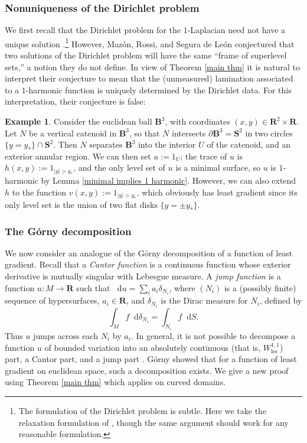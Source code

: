 \documentclass[reqno,11pt]{amsart}
\newcommand{\RR}{\mathbf{R}}
\newcommand{\Sph}{\mathbf S}
\newcommand{\Ball}{\mathbf{B}}
\newcommand*\dif{\mathop{}\!\mathrm{d}}
\newcommand{\dfn}[1]{\emph{#1}\index{#1}}
\newcommand{\loc}{\mathrm{loc}}
\theoremstyle{definition}
\newtheorem{example}[theorem]{Example}
\numberwithin{equation}{section}
\begin{document}
\subsubsection{Nonuniqueness of the Dirichlet problem}
We first recall that the Dirichlet problem for the $1$-Laplacian need not have a unique solution \cite[Example 2.7]{Mazon14}.\footnote{The formulation of the Dirichlet problem is subtle. Here we take the relaxation formulation of \cite[Definition 2.3]{Mazon14}, though the same argument should work for any reasonable formulation.}
However, Maz\'on, Rossi, and Segura de Le\'on \cite[Remark 2.8]{Mazon14} conjectured that two solutions of the Dirichlet problem will have the same ``frame of superlevel sets,'' a notion they do not define.
In view of Theorem \ref{main thm} it is natural to interpret their conjecture to mean that the (unmeasured) lamination associated to a $1$-harmonic function is uniquely determined by the Dirichlet data.
For this interpretation, their conjecture is false:

\begin{example}
Consider the euclidean ball $\Ball^3$, with coordinates $(x, y) \in \RR^2 \times \RR$.
Let $N$ be a vertical catenoid in $\Ball^3$, so that $N$ intersects $\partial \Ball^3 = \Sph^2$ in two circles $\{y = y_*\} \cap \Sph^2$.
Then $N$ separates $\Ball^3$ into the interior $U$ of the catenoid, and an exterior annular region.
We can then set $u := 1_U$; the trace of $u$ is $h(x, y) := 1_{|y| > y_*}$, and the only level set of $u$ is a minimal surface, so $u$ is $1$-harmonic by Lemma \ref{minimal implies 1 harmonic}.
However, we can also extend $h$ to the function $v(x, y) := 1_{|y| > y_*}$, which obviously has least gradient since its only level set is the union of two flat disks $\{y = \pm y_*\}$.
\end{example}

\subsubsection{The G\'orny decomposition}
We now consider an analogue of the G\'orny decomposition \cite[Theorem 1.2]{górny2017planar} of a function of least gradient.
Recall that a \dfn{Cantor function} is a continuous function whose exterior derivative is mutually singular with Lebesgue measure.
A \dfn{jump function} is a function $u: M \to \RR$ such that $\dif u = \sum_i a_i \delta_{N_i}$, where $(N_i)$ is a (possibly finite) sequence of hypersurfaces, $a_i \in \RR$, and $\delta_{N_i}$ is the Dirac measure for $N_i$, defined by
$$\int_M f \dif \delta_{N_i} = \int_{N_i} f \dif S.$$
Thus $u$ jumps across each $N_i$ by $a_i$.
In general, it is not possible to decompose a function $u$ of bounded variation into an absolutely continuous (that is, $W^{1, 1}_\loc$) part, a Cantor part, and a jump part \cite[Example 4.1]{Ambrosio2000FunctionsOB}.
G\'orny showed that for a function of least gradient on euclidean space, such a decomposition exists.
We give a new proof using Theorem \ref{main thm} which applies on curved domains.
\end{document}
